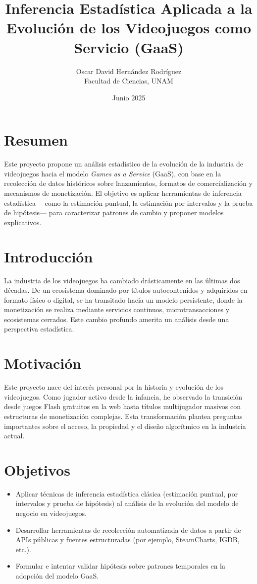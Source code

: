 \documentclass[12pt]{article}
\title{\textbf{Inferencia Estadística Aplicada a la Evolución de los Videojuegos como Servicio (GaaS)}}
\author{Oscar David Hernández Rodríguez \\ Facultad de Ciencias, UNAM}
\date{Junio 2025}
\begin{document}
\maketitle

\section*{Resumen}
Este proyecto propone un análisis estadístico de la evolución de la industria de videojuegos hacia el modelo \emph{Games as a Service} (GaaS), con base en la recolección de datos históricos sobre lanzamientos, formatos de comercialización y mecanismos de monetización. El objetivo es aplicar herramientas de inferencia estadística ---como la estimación puntual, la estimación por intervalos y la prueba de hipótesis--- para caracterizar patrones de cambio y proponer modelos explicativos.

\section{Introducción}
La industria de los videojuegos ha cambiado drásticamente en las últimas dos décadas. De un ecosistema dominado por títulos autocontenidos y adquiridos en formato físico o digital, se ha transitado hacia un modelo persistente, donde la monetización se realiza mediante servicios continuos, microtransacciones y ecosistemas cerrados. Este cambio profundo amerita un análisis desde una perspectiva estadística.

\section{Motivación}
Este proyecto nace del interés personal por la historia y evolución de los videojuegos. Como jugador activo desde la infancia, he observado la transición desde juegos Flash gratuitos en la web hasta títulos multijugador masivos con estructuras de monetización complejas. Esta transformación plantea preguntas importantes sobre el acceso, la propiedad y el diseño algorítmico en la industria actual.

\section{Objetivos}
\begin{itemize}
    \item Aplicar técnicas de inferencia estadística clásica (estimación puntual, por intervalos y prueba de hipótesis) al análisis de la evolución del modelo de negocio en videojuegos.
    \item Desarrollar herramientas de recolección automatizada de datos a partir de APIs públicas y fuentes estructuradas (por ejemplo, SteamCharts, IGDB, etc.).
    \item Formular e intentar validar hipótesis sobre patrones temporales en la adopción del modelo GaaS.
\end{itemize}
\end{document}
